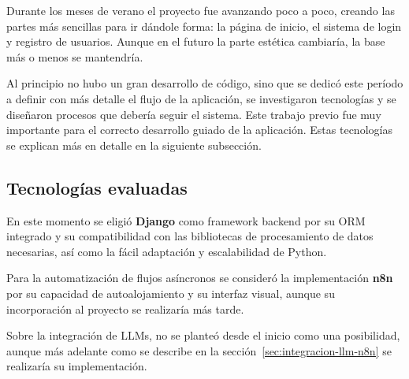 Durante los meses de verano el proyecto fue avanzando poco a poco, creando las partes más sencillas para ir dándole forma: la página de inicio, el sistema de login y registro de usuarios. Aunque en el futuro la parte estética cambiaría, la base más o menos se mantendría.

Al principio no hubo un gran desarrollo de código, sino que se dedicó este período a definir con más detalle el flujo de la aplicación, se investigaron tecnologías y se diseñaron procesos que debería seguir el sistema. Este trabajo previo fue muy importante para el correcto desarrollo guiado de la aplicación. Estas tecnologías se explican más en detalle en la siguiente subsección.


\subsection{Tecnologías evaluadas}
\label{subsec:tecnologias-evaluadas}

En este momento se eligió \textbf{Django} como framework backend por su ORM integrado y su compatibilidad con las bibliotecas de procesamiento de datos necesarias, así como la fácil adaptación y escalabilidad de Python.

Para la automatización de flujos asíncronos se consideró la implementación \textbf{n8n} por su capacidad de autoalojamiento y su interfaz visual, aunque su incorporación al proyecto se realizaría más tarde. 

Sobre la integración de LLMs, no se planteó desde el inicio como una posibilidad, aunque más adelante como se describe en la sección~\ref{sec:integracion-llm-n8n} se realizaría su implementación.
